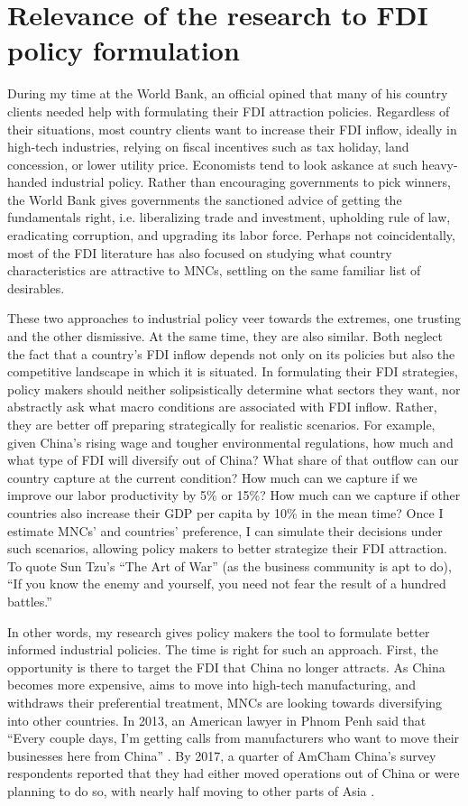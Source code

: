 \section{Relevance of the research to FDI policy formulation}

During my time at the World Bank, an official opined that many of his country
clients needed help with formulating their FDI attraction policies. Regardless
of their situations, most country clients want to increase their FDI inflow,
ideally in high-tech industries, relying on fiscal incentives such as tax
holiday, land concession, or lower utility price. Economists tend to look
askance at such heavy-handed industrial policy. Rather than encouraging
governments to pick winners, the World Bank gives governments the sanctioned
advice of getting the fundamentals right, i.e. liberalizing trade and
investment, upholding rule of law, eradicating corruption, and upgrading its
labor force. Perhaps not coincidentally, most of the FDI literature has also
focused on studying what country characteristics are attractive to MNCs,
settling on the same familiar list of desirables.

These two approaches to industrial policy veer towards the extremes, one
trusting and the other dismissive. At the same time, they are also similar. Both
neglect the fact that a country's FDI inflow depends not only on its policies
but also the competitive landscape in which it is situated. In formulating their
FDI strategies, policy makers should neither solipsistically determine what
sectors they want, nor abstractly ask what macro conditions are associated with
FDI inflow. Rather, they are better off preparing strategically for realistic
scenarios. For example, given China's rising wage and tougher environmental
regulations, how much and what type of FDI will diversify out of China? What
share of that outflow can our country capture at the current condition? How much
can we capture if we improve our labor productivity by 5\% or 15\%? How much can
we capture if other countries also increase their GDP per capita by 10\% in the
mean time? Once I estimate MNCs' and countries' preference, I can simulate their
decisions under such scenarios, allowing policy makers to better strategize
their FDI attraction. To quote Sun Tzu's ``The Art of War'' (as the business
community is apt to do), ``If you know the enemy and yourself, you need not fear
the result of a hundred battles.''

In other words, my research gives policy makers the tool to formulate better
informed industrial policies. The time is right for such an approach. First, the
opportunity is there to target the FDI that China no longer attracts. As China
becomes more expensive, aims to move into high-tech manufacturing, and withdraws
their preferential treatment, MNCs are looking towards diversifying into other
countries. In 2013, an American lawyer in Phnom Penh said that ``Every couple
days, I'm getting calls from manufacturers who want to move their businesses
here from China'' \citep{Bradsher2013}. By 2017, a quarter of AmCham China's
survey respondents reported that they had either moved operations out of China
or were planning to do so, with nearly half moving to other parts of Asia
\citep{AmCham2018}.

